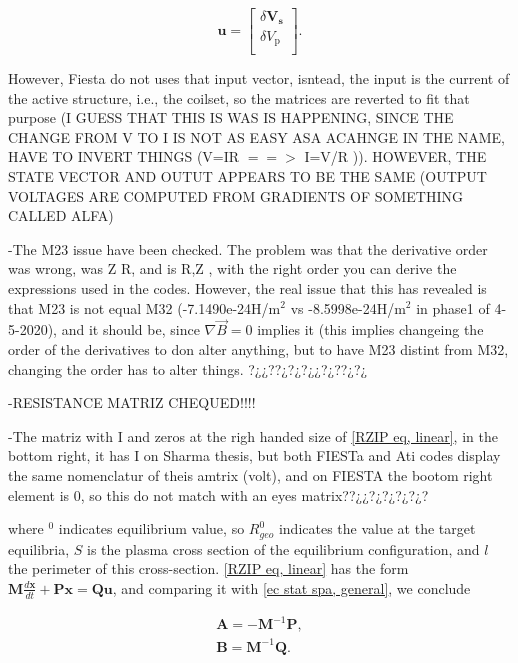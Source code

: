 \documentclass[a4paper,12pt,oneside]{book}
\begin{document}
\begin{equation}
	\boldsymbol{u}=
	\left[
	\begin{array}{c}
	\delta\boldsymbol{V_\text{s}} \\
	\delta V_\text{p} \\
	\end{array}\right]	.
\end{equation}

However, Fiesta do not uses that input vector, isntead, the input is the current of the active structure, i.e., the coilset, so the matrices are reverted to fit that purpose (I GUESS THAT THIS IS WAS IS HAPPENING, SINCE THE CHANGE FROM V TO I IS NOT AS EASY ASA ACAHNGE IN THE NAME, HAVE TO INVERT THINGS (V=IR $==>$ I=V/R )). HOWEVER, THE STATE VECTOR AND OUTUT APPEARS TO BE THE SAME (OUTPUT VOLTAGES ARE COMPUTED FROM GRADIENTS OF SOMETHING CALLED ALFA) 

-The M23 issue have been checked. The problem was that the derivative order was wrong, was  Z R, and is R,Z , with the right order you can derive the expressions used in the codes. However, the real issue that this has revealed is that M23 is not equal M32 (-7.1490e-24H/m$^2$  vs -8.5998e-24H/m$^2$ in phase1 of 4-5-2020), and it should be, since $\nabla \vec{B}=0$ implies it (this implies changeing the order of the derivatives to don alter anything, but to have M23 distint from M32, changing the order has to alter things. ?¿¿??¿?¿?¿¿?¿??¿?¿

-RESISTANCE MATRIZ CHEQUED!!!!

-The matriz with I and zeros at the righ handed size of  \eqref{RZIP eq, linear}, in the bottom right, it has I on Sharma thesis, but both FIESTa and Ati codes display the same nomenclatur of theis amtrix (volt), and on FIESTA the bootom right element is 0, so this do not match with an eyes matrix??¿¿?¿?¿?¿?¿?


where $^0$ indicates equilibrium value, so $R_{geo}^0$ indicates the value at the target equilibria, $S$ is the plasma cross section of the equilibrium configuration, and $l$ the perimeter of this cross-section. \eqref{RZIP eq, linear} has the form $\boldsymbol{M} \frac{d\boldsymbol{x}}{dt}+\boldsymbol{P x}=\boldsymbol{Q u}$, and comparing it with \eqref{ec stat spa, general}, we conclude

\begin{equation}
\left.
\begin{array}{c}
\boldsymbol{A}=-\boldsymbol{M}^{-1}\boldsymbol{P}, \\
\boldsymbol{B}=\boldsymbol{M}^{-1}\boldsymbol{Q}.
\end{array}
\right.
\end{equation}
\end{document}
